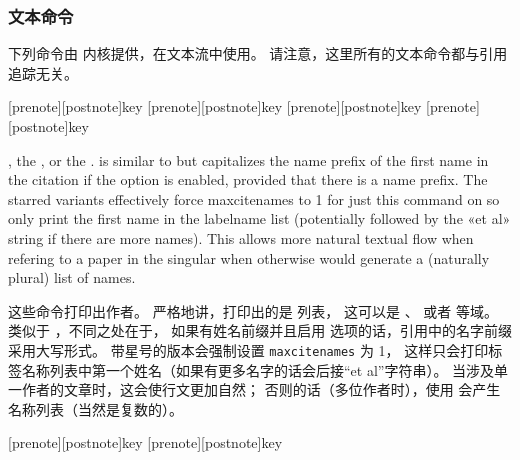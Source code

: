 \subsubsection{文本命令}%
\label{use:cit:txt}


下列命令由 \biblatex 内核提供，在文本流中使用。
请注意，这里所有的文本命令都与引用追踪无关。

\begin{ltxsyntax}

[prenote][postnote]{key}
[prenote][postnote]{key}
[prenote][postnote]{key}
[prenote][postnote]{key}

, the , or the .  is similar to  but capitalizes the name prefix of the first name in the citation if the  option is enabled, provided that there is a name prefix. The starred variants effectively force maxcitenames to 1 for just this command on so only print the first name in the labelname list (potentially followed by the «et al» string if there are more names). This allows more natural textual flow when refering to a paper in the singular when otherwise  would generate a (naturally plural) list of names.

这些命令打印出作者。
严格地讲，打印出的是  列表，
这可以是 、 或者  等域。
 类似于 ，不同之处在于，
如果有姓名前缀并且启用   选项的话，引用中的名字前缀采用大写形式。
带星号的版本会强制设置 \texttt{maxcitenames} 为 1，
这样只会打印标签名称列表中第一个姓名（如果有更多名字的话会后接“et al”字符串）。
当涉及单一作者的文章时，这会使行文更加自然；
否则的话（多位作者时），使用  会产生名称列表（当然是复数的）。


[prenote][postnote]{key}
[prenote][postnote]{key}


\end{ltxsyntax}

